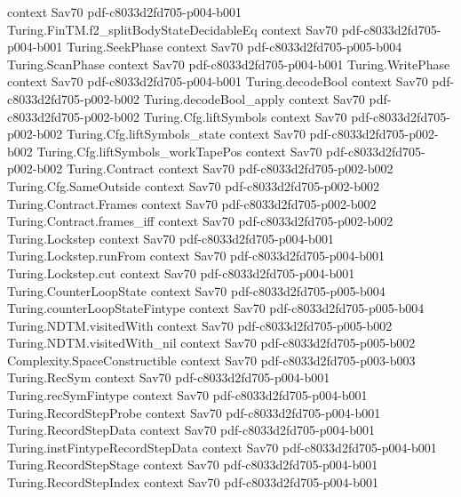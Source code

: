 \begin{theorem}
  {context}
  {Sav70}
  {pdf-c8033d2fd705-p004-b001}
\proofstep
  {Turing.FinTM.f2_splitBodyStateDecidableEq}
  {context}
  {Sav70}
  {pdf-c8033d2fd705-p004-b001}
\proofstep
  {Turing.SeekPhase}
  {context}
  {Sav70}
  {pdf-c8033d2fd705-p005-b004}
\proofstep
  {Turing.ScanPhase}
  {context}
  {Sav70}
  {pdf-c8033d2fd705-p004-b001}
\proofstep
  {Turing.WritePhase}
  {context}
  {Sav70}
  {pdf-c8033d2fd705-p004-b001}
\proofstep
  {Turing.decodeBool}
  {context}
  {Sav70}
  {pdf-c8033d2fd705-p002-b002}
\proofstep
  {Turing.decodeBool_apply}
  {context}
  {Sav70}
  {pdf-c8033d2fd705-p002-b002}
\proofstep
  {Turing.Cfg.liftSymbols}
  {context}
  {Sav70}
  {pdf-c8033d2fd705-p002-b002}
\proofstep
  {Turing.Cfg.liftSymbols_state}
  {context}
  {Sav70}
  {pdf-c8033d2fd705-p002-b002}
\proofstep
  {Turing.Cfg.liftSymbols_workTapePos}
  {context}
  {Sav70}
  {pdf-c8033d2fd705-p002-b002}
\proofstep
  {Turing.Contract}
  {context}
  {Sav70}
  {pdf-c8033d2fd705-p002-b002}
\proofstep
  {Turing.Cfg.SameOutside}
  {context}
  {Sav70}
  {pdf-c8033d2fd705-p002-b002}
\proofstep
  {Turing.Contract.Frames}
  {context}
  {Sav70}
  {pdf-c8033d2fd705-p002-b002}
\proofstep
  {Turing.Contract.frames_iff}
  {context}
  {Sav70}
  {pdf-c8033d2fd705-p002-b002}
\proofstep
  {Turing.Lockstep}
  {context}
  {Sav70}
  {pdf-c8033d2fd705-p004-b001}
\proofstep
  {Turing.Lockstep.runFrom}
  {context}
  {Sav70}
  {pdf-c8033d2fd705-p004-b001}
\proofstep
  {Turing.Lockstep.cut}
  {context}
  {Sav70}
  {pdf-c8033d2fd705-p004-b001}
\proofstep
  {Turing.CounterLoopState}
  {context}
  {Sav70}
  {pdf-c8033d2fd705-p005-b004}
\proofstep
  {Turing.counterLoopStateFintype}
  {context}
  {Sav70}
  {pdf-c8033d2fd705-p005-b004}
\proofstep
  {Turing.NDTM.visitedWith}
  {context}
  {Sav70}
  {pdf-c8033d2fd705-p005-b002}
\proofstep
  {Turing.NDTM.visitedWith_nil}
  {context}
  {Sav70}
  {pdf-c8033d2fd705-p005-b002}
\proofstep
  {Complexity.SpaceConstructible}
  {context}
  {Sav70}
  {pdf-c8033d2fd705-p003-b003}
\proofstep
  {Turing.RecSym}
  {context}
  {Sav70}
  {pdf-c8033d2fd705-p004-b001}
\proofstep
  {Turing.recSymFintype}
  {context}
  {Sav70}
  {pdf-c8033d2fd705-p004-b001}
\proofstep
  {Turing.RecordStepProbe}
  {context}
  {Sav70}
  {pdf-c8033d2fd705-p004-b001}
\proofstep
  {Turing.RecordStepData}
  {context}
  {Sav70}
  {pdf-c8033d2fd705-p004-b001}
\proofstep
  {Turing.instFintypeRecordStepData}
  {context}
  {Sav70}
  {pdf-c8033d2fd705-p004-b001}
\proofstep
  {Turing.RecordStepStage}
  {context}
  {Sav70}
  {pdf-c8033d2fd705-p004-b001}
\proofstep
  {Turing.RecordStepIndex}
  {context}
  {Sav70}
  {pdf-c8033d2fd705-p004-b001}

\end{theorem}
